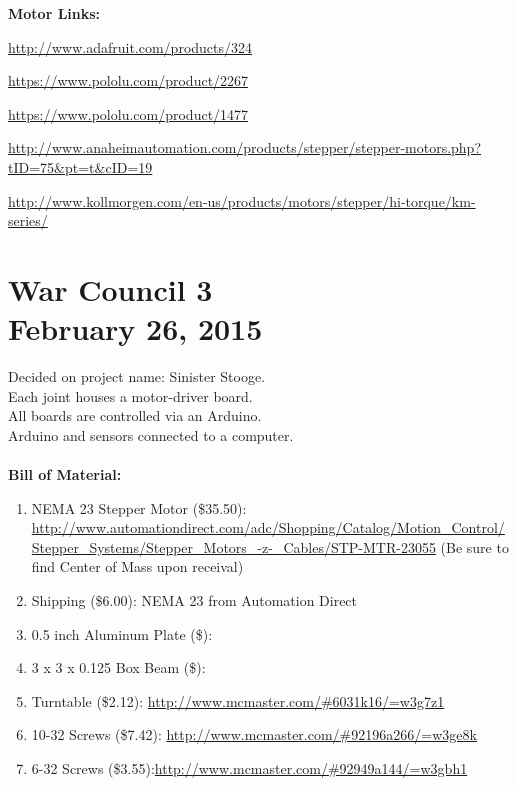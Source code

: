 \documentclass[11pt]{article}
\begin{document}

\noindent \textbf{Motor Links:}
\begin{compactitem}
	\item \url{http://www.adafruit.com/products/324}
	\item \url{https://www.pololu.com/product/2267}
	\item \url{https://www.pololu.com/product/1477}
	\item \url{http://www.anaheimautomation.com/products/stepper/stepper-motors.php?tID=75&pt=t&cID=19}
	\item \url{http://www.kollmorgen.com/en-us/products/motors/stepper/hi-torque/km-series/}
\end{compactitem}

\section{War Council 3 \\ February 26, 2015}
Decided on project name: Sinister Stooge.\\
Each joint houses a motor-driver board.\\
All boards are controlled via an Arduino.\\
Arduino and sensors connected to a computer.\\
\\
\noindent \textbf{Bill of Material:}\\
\begin{enumerate}
	\item NEMA 23 Stepper Motor (\$35.50): \url{http://www.automationdirect.com/adc/Shopping/Catalog/Motion_Control/Stepper_Systems/Stepper_Motors_-z-_Cables/STP-MTR-23055} (Be sure to find Center of Mass upon receival)
	\item Shipping (\$6.00): NEMA 23 from Automation Direct
	\item 0.5 inch Aluminum Plate (\$):
	\item 3 x 3 x 0.125 Box Beam (\$):
	\item Turntable (\$2.12): \url{http://www.mcmaster.com/#6031k16/=w3g7z1}
	\item 10-32 Screws (\$7.42): \url{http://www.mcmaster.com/#92196a266/=w3ge8k}
	\item 6-32 Screws (\$3.55):\url{http://www.mcmaster.com/#92949a144/=w3gbh1}
\end{enumerate}
\end{document}
